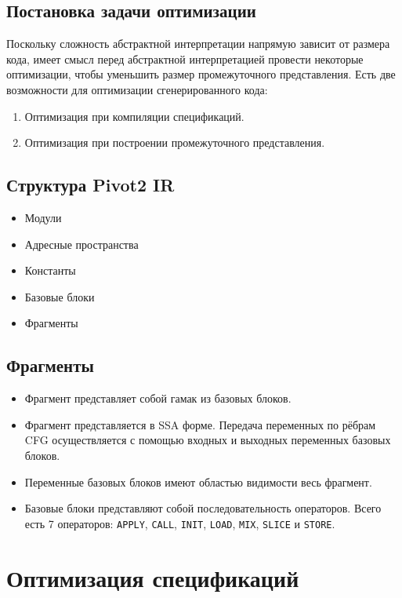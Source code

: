 \documentclass[11pt]{article}
\begin{document}
\subsection{Постановка задачи оптимизации}
\label{sec:orga68c8f8}
Поскольку сложность абстрактной интерпретации напрямую зависит от размера кода, имеет смысл перед абстрактной интерпретацией провести некоторые оптимизации, чтобы уменьшить размер промежуточного представления. Есть две возможности для оптимизации сгенерированного кода:
\begin{enumerate}
\item Оптимизация при компиляции спецификаций.
\item Оптимизация при построении промежуточного представления.
\end{enumerate}
\subsection{Структура Pivot2 IR}
\label{sec:orga4e2c98}
\begin{itemize}
\item Модули
\item Адресные пространства
\item Константы
\item Базовые блоки
\item Фрагменты
\end{itemize}
\subsection{Фрагменты}
\label{sec:org94f6bd8}
\begin{itemize}
\item Фрагмент представляет собой гамак из базовых блоков.
\item Фрагмент представляется в SSA форме. Передача переменных по рёбрам CFG осуществляется с помощью входных и выходных переменных базовых блоков.
\item Переменные базовых блоков имеют областью видимости весь фрагмент.
\item Базовые блоки представляют собой последовательность операторов. Всего есть 7 операторов: \texttt{APPLY}, \texttt{CALL}, \texttt{INIT}, \texttt{LOAD}, \texttt{MIX}, \texttt{SLICE} и \texttt{STORE}.
\end{itemize}
\section{Оптимизация спецификаций}
\label{sec:org77af76a}
\end{document}
